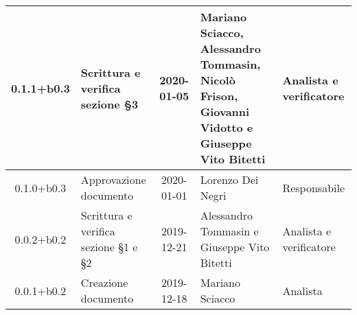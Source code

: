 \begin{center}
\begin{longtable}{|c|p{3.5cm}|c|p{3cm}|p{3cm}|}
	\hline
	0.1.1+b0.3 & Scrittura e verifica sezione \S3 & 2020-01-05 & Mariano Sciacco, Alessandro Tommasin, Nicolò Frison, Giovanni Vidotto e Giuseppe Vito Bitetti & Analista e verificatore \\
	\hline
	0.1.0+b0.3 & Approvazione documento & 2020-01-01 & Lorenzo Dei Negri & Responsabile \\
	\hline
	0.0.2+b0.2 & Scrittura e verifica sezione \S1 e \S2 & 2019-12-21 & Alessandro Tommasin e Giuseppe Vito Bitetti & Analista e verificatore \\
	\hline
	0.0.1+b0.2 & Creazione documento & 2019-12-18 & Mariano Sciacco & Analista \\
	\hline

	\end{longtable}
\end{center}
